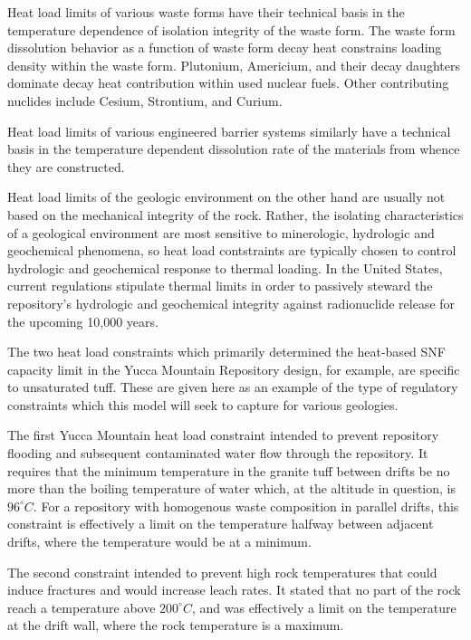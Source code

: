 Heat load limits of various waste forms have their technical basis in 
the temperature dependence of isolation integrity of the waste form.  
The waste form dissolution behavior as a function of waste form decay heat 
constrains loading density within the waste form. Plutonium, Americium, and 
their decay daughters dominate decay heat contribution within used nuclear 
fuels. Other contributing nuclides include Cesium, Strontium, and Curium. 
\cite{piet_which_2007} 
 
Heat load limits of various engineered barrier systems similarly have 
a technical basis in the temperature dependent dissolution rate of the 
materials from whence they are constructed.  

Heat load limits of the geologic environment on the other hand are 
usually not based on the mechanical integrity of the rock.  Rather, 
the isolating characteristics of a geological environment are most 
sensitive to minerologic, hydrologic and geochemical phenomena, so heat load 
contstraints are typically chosen to control hydrologic and 
geochemical response to thermal loading. In the United States, current 
regulations stipulate thermal limits in order to passively steward the 
repository's hydrologic and geochemical integrity against radionuclide  
release for the upcoming 10,000 years.

The two heat load constraints which primarily determined the 
heat-based SNF capacity limit in the Yucca Mountain Repository design, 
for example, are specific to unsaturated tuff. These are given here as an 
example of the type of regulatory constraints which this model will seek to 
capture for various geologies. 

The first Yucca Mountain heat load constraint intended to prevent repository 
flooding and subsequent contaminated water flow through the repository. It 
requires that the minimum temperature in the granite tuff between drifts be no  
more than the boiling temperature of water which, at the altitude in 
question, is $96^{\circ}C$. For a repository with homogenous waste composition 
in parallel drifts, this constraint is effectively a limit on the 
temperature halfway between adjacent drifts, where the temperature 
would be at a minimum.

The second constraint intended to prevent high rock temperatures that 
could induce fractures and would increase leach rates. It stated that no 
part of the rock reach a temperature above $200^{\circ}C$, and was 
effectively a limit on the temperature at the drift wall, where the 
rock temperature is a maximum.  

